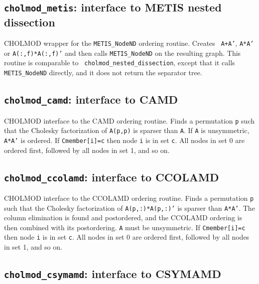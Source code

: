 \documentclass[11pt]{article}
\begin{document}
\subsection{{\tt cholmod\_metis}: interface to METIS nested dissection}


CHOLMOD wrapper for the {\tt METIS\_NodeND} ordering routine.  Creates {\tt
A+A'}, {\tt A*A'} or {\tt A(:,f)*A(:,f)'} and then calls {\tt METIS\_NodeND} on
the resulting graph.  This routine is comparable to {\tt
cholmod\_nested\_dissection}, except that it calls {\tt METIS\_NodeND}
directly, and it does not return the separator tree.

\subsection{{\tt cholmod\_camd}: interface to CAMD}


CHOLMOD interface to the CAMD ordering routine.  Finds a permutation {\tt p}
such that the Cholesky factorization of {\tt A(p,p)} is sparser than {\tt A}.
If {\tt A} is unsymmetric, {\tt A*A'} is ordered.  If {\tt Cmember[i]=c} then
node {\tt i} is in set {\tt c}.  All nodes in set 0 are ordered first, followed
by all nodes in set 1, and so on.

\subsection{{\tt cholmod\_ccolamd}: interface to CCOLAMD}


CHOLMOD interface to the CCOLAMD ordering routine.  Finds a permutation {\tt p}
such that the Cholesky factorization of {\tt A(p,:)*A(p,:)'} is sparser than
{\tt A*A'}.  The column elimination is found and postordered, and the CCOLAMD
ordering is then combined with its postordering.  {\tt A} must be unsymmetric.
If {\tt Cmember[i]=c} then node {\tt i} is in set {\tt c}.  All nodes in set 0
are ordered first, followed by all nodes in set 1, and so on.

\subsection{{\tt cholmod\_csymamd}: interface to CSYMAMD}
\end{document}

